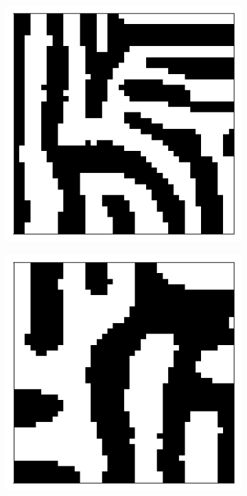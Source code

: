 \documentclass{article}
\begin{document}
\begin{figure}[h]
	\centering
	\begin{subfigure}[t]{0.21\linewidth}
		\centering
		\includegraphics[width = 1.0\linewidth, trim={5 5 5 10}, clip=true]{figures/N20M40l05d05_2_dominance.png}
		\label{fig:dom05}	
	\end{subfigure}%
	\hspace{0.05\linewidth}
	\begin{subfigure}[t]{0.21\linewidth}
		\centering
		\includegraphics[width = 1.0\linewidth, trim={5 5 5 10}, clip=true]{figures/N20M40l075d05_2_dominance.png}

\end{subfigure}
\end{figure}
\end{document}
